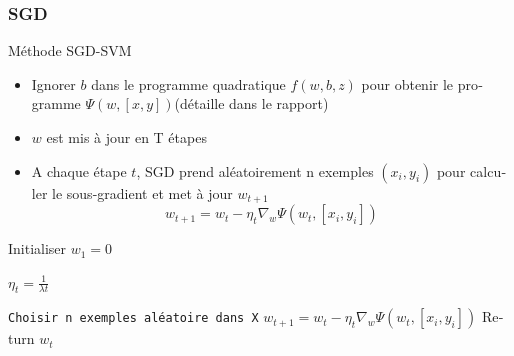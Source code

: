 \documentclass[11pt]{beamer}
\begin{document}
\begin{otherlanguage}{french}
\subsubsection*{SGD}


\begin{frame}{Méthode SGD-SVM}
\begin{itemize}
\item Ignorer $b$ dans le programme quadratique $f(w, b, z)$ pour obtenir le programme $\Psi(w, [x, y])$(détaille dans le rapport)
\pause
\item $w$ est mis à jour en T étapes
\pause
\item A chaque étape $t$, SGD prend aléatoirement n exemples $(x_i, y_i)$ pour calculer le sous-gradient et met à jour $w_{t+1}$
\pause
\begin{equation}
w_{t+1} = w_t - \eta_t\nabla_w{\Psi(w_t, [x_i, y_i])}
\label{f9}
\end{equation}
\end{itemize}
\pause
\begin{algorithm}[H]
\caption{\scriptsize L'algorithm d'apprentissage SGD-SVM binaire}
\label{sgdal}
\scriptsize
\begin{algorithmic}[1]

\State Initialiser $w_1 = 0$


\State $\eta_t = \frac{1}{\lambda t}$

\State \texttt{Choisir n exemples aléatoire dans X}
\State $w_{t+1} = w_t - \eta_t\nabla_w{\Psi(w_t, [x_i, y_i])}$
\EndFor
\State Return $w_{t}$
\EndProcedure
\end{algorithmic}
\end{algorithm}
\end{frame}


\end{otherlanguage}
\end{document}
